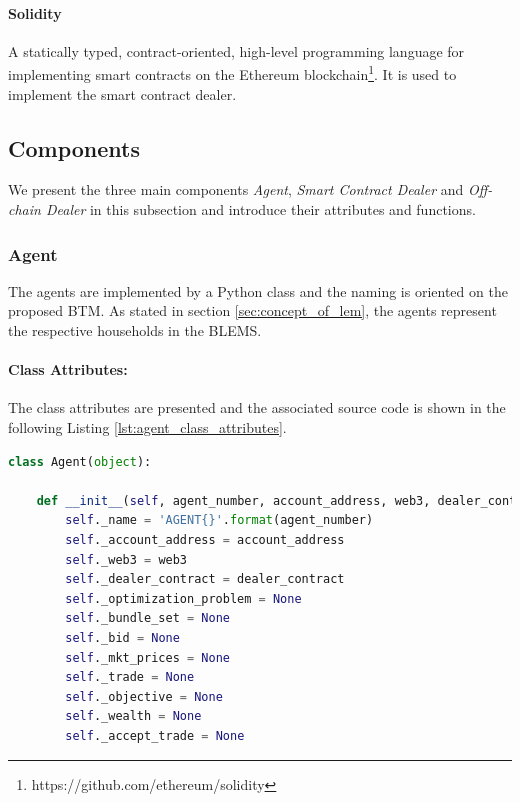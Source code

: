 \paragraph{Solidity}
A statically typed, contract-oriented, high-level programming language for implementing smart contracts on the Ethereum
blockchain\footnote{https://github.com/ethereum/solidity}.
It is used to implement the smart contract dealer. 

\clearpage
\subsection{Components}
\label{sec:components_of_simulation}
We present the three main components \textit{Agent}, \textit{Smart Contract Dealer} and \textit{Off-chain Dealer} 
in this subsection and introduce their attributes and functions. 

\subsubsection{Agent}
\label{sec:agent_class}
The agents are implemented by a Python class and the naming is oriented on the proposed BTM.
As stated in section \ref{sec:concept_of_lem}, the agents represent the respective households in the BLEMS. 


\paragraph{Class Attributes:} The class attributes are presented and the associated source code is shown
in the following Listing \ref{lst:agent_class_attributes}.

\begin{lstlisting}[label=lst:agent_class_attributes, caption=Class Attributes of Agent, language=Python]
    class Agent(object):

    def __init__(self, agent_number, account_address, web3, dealer_contract):
        self._name = 'AGENT{}'.format(agent_number)
        self._account_address = account_address
        self._web3 = web3
        self._dealer_contract = dealer_contract
        self._optimization_problem = None
        self._bundle_set = None
        self._bid = None
        self._mkt_prices = None
        self._trade = None
        self._objective = None
        self._wealth = None
        self._accept_trade = None
\end{lstlisting}


